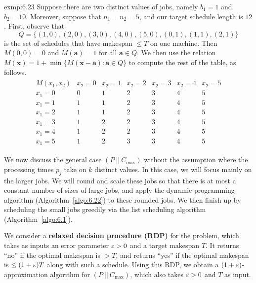 \begin{exmp}{exmp:6.23}
    Suppose there are two distinct values of jobs, namely $b_1 = 1$ 
    and $b_2 = 10$. Moreover, suppose that $n_1 = n_2 = 5$, and 
    our target schedule length is $12$. First, observe that 
    \[ Q = \{(1, 0), (2, 0), (3, 0), (4, 0), (5, 0), (0, 1), (1, 1), (2, 1)\} \] 
    is the set of schedules that have makespan $\leq T$ on one machine. 
    Then $M(0, 0) = 0$ and $M(\mathbf a) = 1$ for all $\mathbf a \in Q$. 
    We then use the relation $M(\mathbf x) = 1 + \min\{M(\mathbf x - \mathbf a) 
    : \mathbf a \in Q\}$ to compute the rest of the table, as follows. 
    \begin{align*}
        \begin{array}{c|c|c|c|c|c|c} 
            M(x_1, x_2) & x_2 = 0 & x_2 = 1 & x_2 = 2 & x_2 = 3 & x_2 = 4 & x_2 = 5 \\ \hline 
            x_1 = 0 & 0 & 1 & 2 & 3 & 4 & 5 \\ \hline 
            x_1 = 1 & 1 & 1 & 2 & 3 & 4 & 5 \\ \hline 
            x_1 = 2 & 1 & 1 & 2 & 3 & 4 & 5 \\ \hline 
            x_1 = 3 & 1 & 2 & 2 & 3 & 4 & 5 \\ \hline 
            x_1 = 4 & 1 & 2 & 2 & 3 & 4 & 5 \\ \hline 
            x_1 = 5 & 1 & 2 & 3 & 3 & 4 & 5 
        \end{array}
    \end{align*}
\end{exmp}

We now discuss the general case $(P~||~C_{\max})$ without the assumption 
where the processing times $p_j$ take on $k$ distinct values. In this 
case, we will focus mainly on the larger jobs. We will round and scale 
these jobs so that there is at most a constant number of sizes of large 
jobs, and apply the dynamic programming algorithm (Algorithm~\ref{algo:6.22}) 
to these rounded jobs. We then finish up by scheduling the small jobs greedily 
via the list scheduling algorithm (Algorithm~\ref{algo:6.1}).

We consider a {\bf relaxed decision procedure (RDP)} for the problem, 
which takes as inputs an error parameter $\varepsilon > 0$ and a target makespan $T$. 
It returns ``no'' if the optimal makespan is $>T$, and returns ``yes'' 
if the optimal makespan is $\leq (1+\varepsilon)T$ along with such a schedule. 
Using this RDP, we obtain a $(1+\varepsilon)$-approximation algorithm for 
$(P~||~C_{\max})$, which also takes $\varepsilon > 0$ and $T$ as input. 

